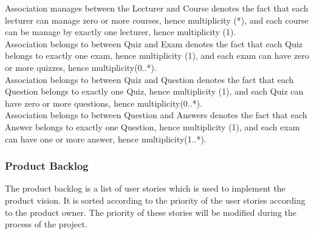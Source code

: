 \documentclass{scrartcl}
\begin{document}
Association manages between the Lecturer and Course denotes the fact that each lecturer can manage zero or more courses, hence multiplicity (*), and each course can be manage by exactly one lecturer, hence multiplicity (1). \\
Association belongs to between Quiz and Exam denotes the fact that each Quiz belongs to exactly one exam, hence multiplicity (1), and each exam can have zero or more quizzes, hence multiplicity(0..*). \\
Association belongs to between Quiz and Question denotes the fact that each Question belongs to exactly one Quiz, hence multiplicity (1), and each Quiz can have zero or more questions, hence multiplicity(0..*). \\
Association belongs to between Question and Answers denotes the fact that each Answer belongs to exactly one Question, hence multiplicity (1), and each exam can have one or more answer, hence multiplicity(1..*). \\
\subsubsection{Product Backlog}
The product backlog is a list of user stories which is used to implement the product vision. It is sorted according to the priority of the user stories according to the product owner. The priority of these stories will be modified during the process of the project.\\
\end{document}
